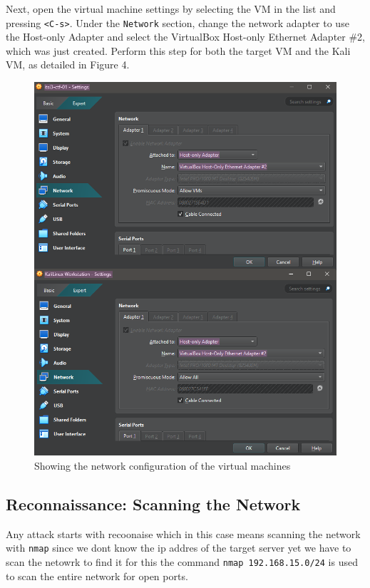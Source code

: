 \documentclass[a4paper]{article}
\newcommand{\abc}{\hfill \break}
\begin{document}
Next, open the virtual machine settings by selecting the VM in the list and pressing \texttt{<C-s>}. Under the \texttt{Network} section, change the network adapter to use the Host-only Adapter and select the VirtualBox Host-only Ethernet Adapter \#2, which was just created. Perform this step for both the target VM and the Kali VM, as detailed in Figure 4.
\begin{figure}[ht]
	\includegraphics[scale=0.4]{./images/vmnwconf.png}
	\centering
	\caption{Showing the network configuration of the virtual machines}
\end{figure}\abc
\newpage
\subsection{Reconnaissance: Scanning the Network}
Any attack starts with recoonaise which in this case means scanning the network with \texttt{nmap} since we dont know the ip addres of the target server yet we have to scan the netowrk to find it for this the command \texttt{nmap 192.168.15.0/24} is used to scan the entire network for open ports.
\end{document}
